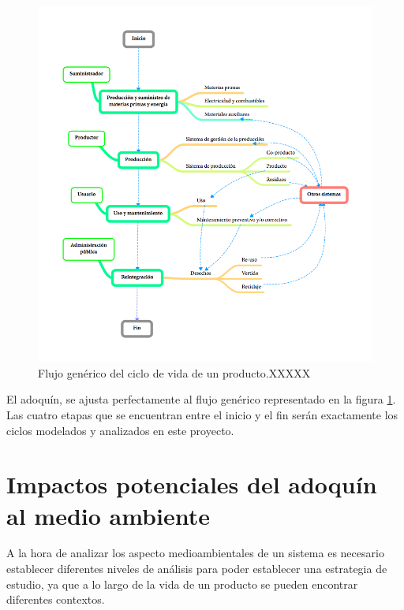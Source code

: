 \begin{figure}[!htb]
\centering
\includegraphics[width=15cm]{img/flujo_generico_acv.png}
\caption{Flujo genérico del ciclo de vida de un producto.XXXXX}
\label{fig:flujo_generico_acv}
\end{figure}

El adoquín, se ajusta perfectamente al flujo genérico representado en la figura \ref{fig:flujo_generico_acv}. Las cuatro etapas que se encuentran entre el inicio y el fin serán exactamente los ciclos modelados y analizados en este proyecto.

\section{Impactos potenciales del adoquín al medio ambiente}
A la hora de analizar los aspecto medioambientales de un sistema es necesario establecer diferentes niveles de análisis para poder establecer una estrategia de estudio, ya que a lo largo de la vida de un producto se pueden encontrar diferentes contextos.

